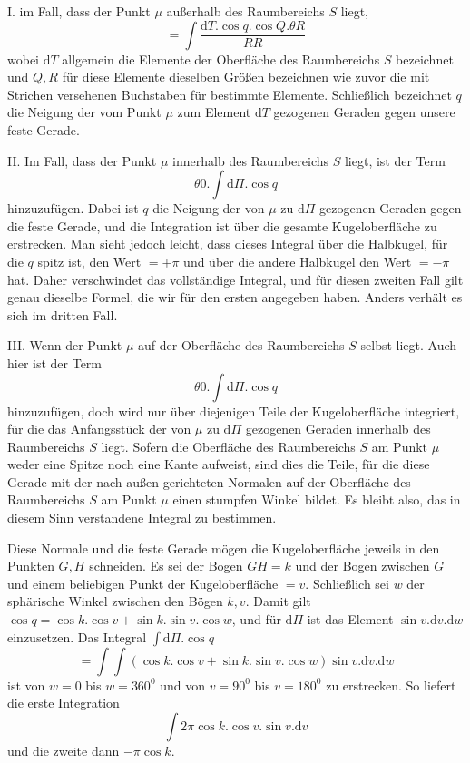 I. im Fall, dass der Punkt $\mu$ außerhalb des Raumbereichs $S$ liegt,
\[
=\int\frac{\mathrm{d}T.\cos q.\cos Q.\theta R}{RR}
\]
wobei $\mathrm{d}T$ allgemein die Elemente der Oberfläche des Raumbereichs $S$ bezeichnet und $Q,R$ für diese Elemente dieselben Größen bezeichnen wie zuvor die mit Strichen versehenen Buchstaben für bestimmte Elemente. Schließlich bezeichnet $q$ die Neigung der vom Punkt $\mu$ zum Element $\mathrm{d}T$ gezogenen Geraden gegen unsere feste Gerade.

II. Im Fall, dass der Punkt $\mu$ innerhalb des Raumbereichs $S$ liegt, ist der Term
\[
\theta0.\int\mathrm{d}\Pi.\cos q
\]
hinzuzufügen. Dabei ist $q$ die Neigung der von $\mu$ zu $\mathrm{d}\Pi$ gezogenen Geraden gegen die feste Gerade, und die Integration ist über die gesamte Kugeloberfläche zu erstrecken. Man sieht jedoch leicht, dass dieses Integral über die Halbkugel, für die $q$ spitz ist, den Wert $=+\pi$ und über die andere Halbkugel den Wert $=-\pi$ hat. Daher verschwindet das vollständige Integral, und für diesen zweiten Fall gilt genau dieselbe Formel, die wir für den ersten angegeben haben. Anders verhält es sich im dritten Fall.

III. Wenn der Punkt $\mu$ auf der Oberfläche des Raumbereichs $S$ selbst liegt. Auch hier ist der Term
\[
\theta0.\int\mathrm{d}\Pi.\cos q
\]
hinzuzufügen, doch wird nur über diejenigen Teile der Kugeloberfläche integriert, für die das Anfangsstück der von $\mu$ zu $\mathrm{d}\Pi$ gezogenen Geraden innerhalb des Raumbereichs $S$ liegt. Sofern die Oberfläche des Raumbereichs $S$ am Punkt $\mu$ weder eine Spitze noch eine Kante aufweist, sind dies die Teile, für die diese Gerade mit der nach außen gerichteten Normalen auf der Oberfläche des Raumbereichs $S$ am Punkt $\mu$ einen stumpfen Winkel bildet. Es bleibt also, das in diesem Sinn verstandene Integral zu bestimmen.

Diese Normale und die feste Gerade mögen die Kugeloberfläche jeweils in den Punkten $G,H$ schneiden. Es sei der Bogen $GH=k$ und der Bogen zwischen $G$ und einem beliebigen Punkt der Kugeloberfläche $=v$. Schließlich sei $w$ der sphärische Winkel zwischen den Bögen $k,v$. Damit gilt $\cos q=\cos k.\cos v+\sin k.\sin v.\cos w$, und für $\mathrm{d}\Pi$ ist das Element $\sin v.\mathrm{d}v.\mathrm{d}w$ einzusetzen. Das Integral $\int\mathrm{d}\Pi.\cos q$
\[
=\int\int(\cos k.\cos v+\sin k.\sin v.\cos w)\sin v.\mathrm{d}v.\mathrm{d}w
\]
ist von $w=0$ bis $w=360^0$ und von $v=90^0$ bis $v=180^0$ zu erstrecken. So liefert die erste Integration
\[
\int2\pi\cos k.\cos v.\sin v.\mathrm{d}v
\]
und die zweite dann $-\pi\cos k$.

